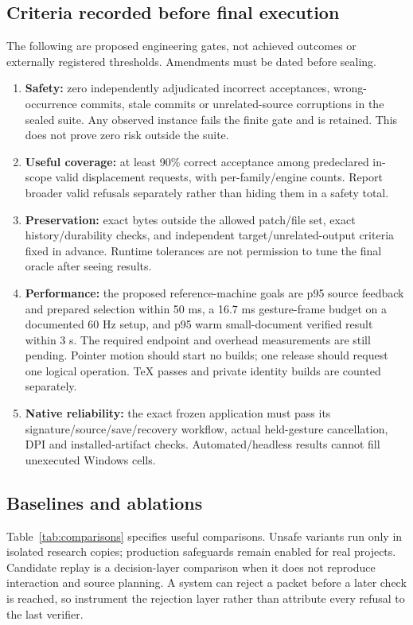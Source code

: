 \subsection{Criteria recorded before final execution}
The following are proposed engineering gates, not achieved outcomes or
externally registered thresholds. Amendments must be dated before sealing.
\begin{enumerate}
\item \textbf{Safety:} zero independently adjudicated incorrect acceptances,
wrong-occurrence commits, stale commits or unrelated-source corruptions in
the sealed suite. Any observed instance fails the finite gate and is retained.
This does not prove zero risk outside the suite.
\item \textbf{Useful coverage:} at least 90\% correct acceptance among
predeclared in-scope valid displacement requests, with per-family/engine
counts. Report broader valid refusals separately rather than hiding them in
a safety total.
\item \textbf{Preservation:} exact bytes outside the allowed patch/file set,
exact history/durability checks, and independent target/unrelated-output
criteria fixed in advance. Runtime tolerances are not permission to tune the
final oracle after seeing results.
\item \textbf{Performance:} the proposed reference-machine goals are p95 source
feedback and prepared selection within 50 ms, a 16.7 ms gesture-frame budget
on a documented 60 Hz setup, and p95 warm small-document verified result within
3 s. The required endpoint and overhead measurements are still pending.
Pointer motion should start no builds; one release should request one logical
operation. TeX passes and private identity builds are counted separately.
\item \textbf{Native reliability:} the exact frozen application must pass its
signature/source/save/recovery workflow, actual held-gesture cancellation,
DPI and installed-artifact checks. Automated/headless results cannot fill
unexecuted Windows cells.
\end{enumerate}

\subsection{Baselines and ablations}
Table~\ref{tab:comparisons} specifies useful comparisons. Unsafe variants run
only in isolated research copies; production safeguards remain enabled for
real projects. Candidate replay is a decision-layer comparison when it does
not reproduce interaction and source planning. A system can reject a packet
before a later check is reached, so instrument the rejection layer rather than
attribute every refusal to the last verifier.

